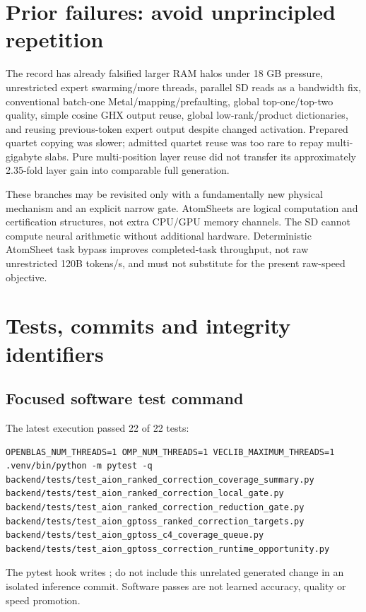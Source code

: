 \documentclass[11pt,a4paper]{article}
\begin{document}
\section{Prior failures: avoid unprincipled repetition}
The record has already falsified larger RAM halos under 18 GB pressure,
unrestricted expert swarming/more threads, parallel SD reads as a bandwidth
fix, conventional batch-one Metal/mapping/prefaulting, global top-one/top-two
quality, simple cosine GHX output reuse, global low-rank/product dictionaries,
and reusing previous-token expert output despite changed activation.
Prepared quartet copying was slower; admitted quartet reuse was too rare to
repay multi-gigabyte slabs. Pure multi-position layer reuse did not transfer
its approximately 2.35-fold layer gain into comparable full generation.

These branches may be revisited only with a fundamentally new physical
mechanism and an explicit narrow gate. AtomSheets are logical computation
and certification structures, not extra CPU/GPU memory channels. The SD
cannot compute neural arithmetic without additional hardware. Deterministic
AtomSheet task bypass improves completed-task throughput, not raw unrestricted
120B tokens/s, and must not substitute for the present raw-speed objective.

\section{Tests, commits and integrity identifiers}
\subsection{Focused software test command}
The latest execution passed 22 of 22 tests:
\begin{lstlisting}
OPENBLAS_NUM_THREADS=1 OMP_NUM_THREADS=1 VECLIB_MAXIMUM_THREADS=1 .venv/bin/python -m pytest -q backend/tests/test_aion_ranked_correction_coverage_summary.py backend/tests/test_aion_ranked_correction_local_gate.py backend/tests/test_aion_ranked_correction_reduction_gate.py backend/tests/test_aion_gptoss_ranked_correction_targets.py backend/tests/test_aion_gptoss_c4_coverage_queue.py backend/tests/test_aion_gptoss_correction_runtime_opportunity.py
\end{lstlisting}
The pytest hook writes ; do not include this
unrelated generated change in an isolated inference commit. Software passes
are not learned accuracy, quality or speed promotion.
\end{document}
